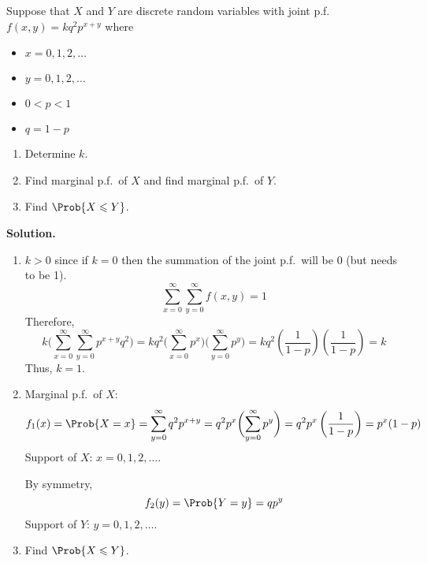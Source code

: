 \begin{Example}{}{}
    Suppose that $ X $ and $ Y $ are discrete random variables
    with joint p.f.\ $ f(x,y)=kq^2 p^{x+y} $ where
    \begin{itemize}
        \item $ x=0,1,2,\ldots $
        \item $ y=0,1,2,\ldots $
        \item $ 0<p<1 $
        \item $ q=1-p $
    \end{itemize}
    \begin{enumerate}[label=(\roman*)]
        \item Determine $ k $.
        \item Find marginal p.f.\ of $ X $ and
              find marginal p.f.\ of $ Y $.
        \item Find $ \Prob{X\leqslant Y} $.
    \end{enumerate}
    \textbf{Solution.}
    \begin{enumerate}[label=(\roman*)]
        \item $ k>0 $ since if $ k=0 $ then the summation
              of the joint p.f.\ will be 0 (but needs to be 1).
              \[\sum\limits_{x=0}^{\infty}
                  \sum\limits_{y=0}^{\infty} f(x,y)=1\]
              Therefore,
              \[k\biggl(\sum\limits_{x=0}^{\infty}
                  \sum\limits_{y=0}^{\infty} p^{x+y}q^2\biggr)=
                  kq^2\biggl(\sum\limits_{x=0}^{\infty} p^x\biggr)
                  \biggl(\sum\limits_{y=0}^{\infty}p^y\biggr)=kq^2
                  \left( \frac{1}{1-p}  \right)\left( \frac{1}{1-p} \right)=k
              \]
              Thus, $ k=1 $.
        \item Marginal p.f.\ of $ X $:
              \[ f_1(x)=\Prob{X=x}=
                  \sum\limits_{y=0}^{\infty} q^2p^{x+y}=
                  q^2 p^x
                  \biggl(\sum\limits_{y=0}^{\infty} p^y \biggr)
                  =q^2 p^x \left( \frac{1}{1-p}  \right)=p^x(1-p) \]
              Support of $ X $: $ x=0,1,2,\ldots $.

              By symmetry,
              \[ f_2(y)=\Prob{Y=y}=qp^y \]
              Support of $ Y $: $ y=0,1,2,\ldots $.
        \item Find $ \Prob{X\leqslant Y} $.


\end{enumerate}
\end{Example}
